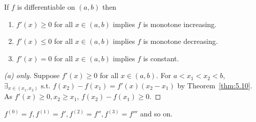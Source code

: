 \begin{thm}[11]
	If $f$ is differentiable on $(a,b)$ then
	\begin{enumerate}
		\item  $f'(x)\ge 0$ for all $x \in (a,b)$ implies $f$ is monotone increasing.
		\item  $f'(x)\le 0$ for all $x \in (a,b)$ implies $f$ is monotone decreasing.
		\item  $f'(x)= 0$ for all $x \in (a,b)$ implies $f$ is constant.
	\end{enumerate}
	\begin{proof}[(a) only]
		Suppose $f'(x)\ge 0$ for all $x \in (a,b)$.
		For $a<x_1<x_2<b$, $\exists_{x \in (x_1,x_2)} \text{ s.t. } f(x_2)-f(x_1)=f'(x)(x_2-x_1)$ by Theorem~\ref{thm:5.10}.
		As $f'(x)\ge 0, x_2\ge x_1$, $f(x_2)-f(x_1)\ge 0$.
	\end{proof}
\end{thm}

\begin{definition}
	$f^{(0)}=f, f^{(1)}=f', f^{(2)}=f'', f^{(3)}=f'''$ and so on.
\end{definition}

